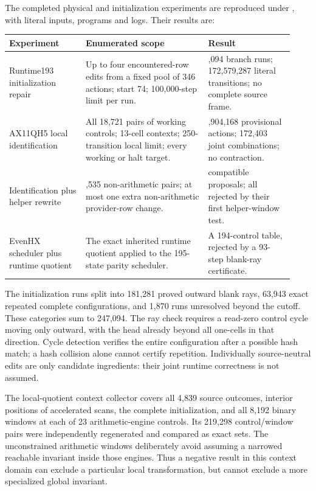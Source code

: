 The completed physical and initialization experiments are reproduced under
, with literal inputs, programs and logs.
Their results are:

\begin{longtable}{@{}>{\raggedright\arraybackslash}p{0.25\linewidth}>{\raggedright\arraybackslash}p{0.40\linewidth}>{\raggedright\arraybackslash}p{0.28\linewidth}@{}}
\toprule Experiment & Enumerated scope & Result\\\midrule\endhead
Runtime193 initialization repair & Up to four encountered-row edits from a fixed pool of 346 actions; start 74; 100,000-step limit per run. & 247,094 branch runs; 172,579,287 literal transitions; no complete source frame.\\[5pt]
AX11QH5 local identification & All 18,721 pairs of working controls; 13-cell contexts; 250-transition local limit; every working or halt target. & 24,904,168 provisional actions; 172,403 joint combinations; no contraction.\\[5pt]
Identification plus helper rewrite & 14,535 non-arithmetic pairs; at most one extra non-arithmetic provider-row change. & 54 compatible proposals; all rejected by their first helper-window test.\\[5pt]
EvenHX scheduler plus runtime quotient & The exact inherited runtime quotient applied to the 195-state parity scheduler. & A 194-control table, rejected by a 93-step blank-ray certificate.\\
\bottomrule
\end{longtable}

The initialization runs split into 181,281 proved outward blank rays,
63,943 exact repeated complete configurations, and 1,870 runs unresolved
beyond the cutoff. These categories sum to 247,094. The ray check requires
a read-zero control cycle moving only outward, with the head already beyond
all one-cells in that direction. Cycle detection verifies the entire
configuration after a possible hash match; a hash collision alone cannot
certify repetition. Individually source-neutral edits are only candidate
ingredients: their joint runtime correctness is not assumed.

The local-quotient context collector covers all 4,839 source outcomes,
interior positions of accelerated scans, the complete initialization, and
all 8,192 binary windows at each of 23 arithmetic-engine controls. Its
219,298 control/window pairs were independently regenerated and compared
as exact sets. The unconstrained arithmetic windows deliberately avoid
assuming a narrowed reachable invariant inside those engines. Thus a
negative result in this context domain can exclude a particular local
transformation, but cannot exclude a more specialized global invariant.

